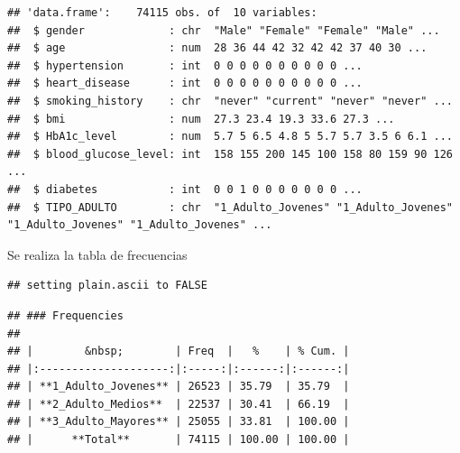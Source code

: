 \documentclass[
]{article}
\newenvironment{Shaded}{\begin{snugshade}}{\end{snugshade}}
\newcommand{\AttributeTok}[1]{\textcolor[rgb]{0.13,0.29,0.53}{#1}}
\newcommand{\ConstantTok}[1]{\textcolor[rgb]{0.56,0.35,0.01}{#1}}
\newcommand{\FunctionTok}[1]{\textcolor[rgb]{0.13,0.29,0.53}{\textbf{#1}}}
\newcommand{\NormalTok}[1]{#1}
\newcommand{\SpecialCharTok}[1]{\textcolor[rgb]{0.81,0.36,0.00}{\textbf{#1}}}
\newcommand{\StringTok}[1]{\textcolor[rgb]{0.31,0.60,0.02}{#1}}
\begin{document}
\begin{verbatim}
## 'data.frame':    74115 obs. of  10 variables:
##  $ gender             : chr  "Male" "Female" "Female" "Male" ...
##  $ age                : num  28 36 44 42 32 42 42 37 40 30 ...
##  $ hypertension       : int  0 0 0 0 0 0 0 0 0 0 ...
##  $ heart_disease      : int  0 0 0 0 0 0 0 0 0 0 ...
##  $ smoking_history    : chr  "never" "current" "never" "never" ...
##  $ bmi                : num  27.3 23.4 19.3 33.6 27.3 ...
##  $ HbA1c_level        : num  5.7 5 6.5 4.8 5 5.7 5.7 3.5 6 6.1 ...
##  $ blood_glucose_level: int  158 155 200 145 100 158 80 159 90 126 ...
##  $ diabetes           : int  0 0 1 0 0 0 0 0 0 0 ...
##  $ TIPO_ADULTO        : chr  "1_Adulto_Jovenes" "1_Adulto_Jovenes" "1_Adulto_Jovenes" "1_Adulto_Jovenes" ...
\end{verbatim}

Se realiza la tabla de frecuencias

\begin{Shaded}
\end{Shaded}

\begin{verbatim}
## setting plain.ascii to FALSE
\end{verbatim}

\begin{verbatim}
## ### Frequencies  
## 
## |        &nbsp;        | Freq  |   %    | % Cum. |
## |:--------------------:|:-----:|:------:|:------:|
## | **1_Adulto_Jovenes** | 26523 | 35.79  | 35.79  |
## | **2_Adulto_Medios**  | 22537 | 30.41  | 66.19  |
## | **3_Adulto_Mayores** | 25055 | 33.81  | 100.00 |
## |      **Total**       | 74115 | 100.00 | 100.00 |
\end{verbatim}
\end{document}
